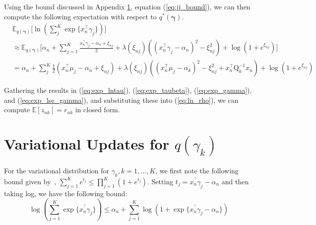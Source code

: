 \documentclass[twoside,11pt]{article}
\newcommand{\tr}{\intercal}
\newcommand{\E}{\mathbb{E}}
\begin{document}
Using the bound discussed in Appendix \ref{app:gamma}, equation (\ref{eq:jj_bound}), we can then compute the following expectation with respect to $q^{*}(\boldsymbol\gamma)$.
\begin{equation} \label{eq:exp_lse_gamma}
\begin{split}
	& \E_{q(\boldsymbol\gamma)} \Bigg[ \ln \left( \sum_{j}^K \exp \{ x_n^{\tr} \gamma_j \}\right) \Bigg] \\
	& \approx \E_{q(\boldsymbol\gamma)} \Bigg[ \alpha_n + \sum_{j = 1}^K \frac{x_n^{\intercal} \gamma_j - \alpha_n + \xi_{nj}}{2} + \lambda(\xi_{nj}) \left( (x_n^{\intercal} \gamma_j - \alpha_n)^2 - \xi_{nj}^2\right) + \log \left( 1 + e^{\xi_{nj}}\right) \Bigg] \\
	& = \alpha_n + \sum_{j}^K \frac{1}{2}\left(x_n^{\tr}\mu_j - \alpha_n + \xi_{nj}\right) + \lambda(\xi_{nj}) \left( (x_n^{\tr} \mu_j - \alpha_k)^2 - \xi_{nj}^2 + x_n^{\tr} \mathrm{Q}_k^{-1} x_n \right) + \log( 1 + e^{\xi_{nj}})
\end{split}
\end{equation}

Gathering the results in (\ref{eq:exp_lntau}), (\ref{eq:exp_taubeta}), (\ref{eq:exp_gamma}), and (\ref{eq:exp_lse_gamma}), and substituting these into (\ref{eq:ln_rho}), we can compute $\E[z_{nk}] = r_{nk}$ in closed form. 



\section{Variational Updates for $q(\gamma_k)$} \label{app:gamma}  



For the variational distribution for $\gamma_k, k = 1, \ldots, K$, we first note the following bound given by~\cite{bouchard:07}, $\sum_{j = 1}^{K} e^{t_j} \leq \prod_{j = 1}^K (1 + e^{t_j})$. Setting $t_j = x_n^{^\intercal} \gamma_j - \alpha_{n}$ and then taking log, we have the following bound:
\begin{equation} \label{eq:log-sum-exp}
	\log \left( \sum_{j = 1}^K \exp\{ x_n^{^\intercal} \gamma_j \}\right) \leq \alpha_n + \sum_{j=1}^K \log \left( 1 + \exp \{ x_n^{^\intercal} \gamma_j - \alpha_n \}\right)
\end{equation}
\end{document}
